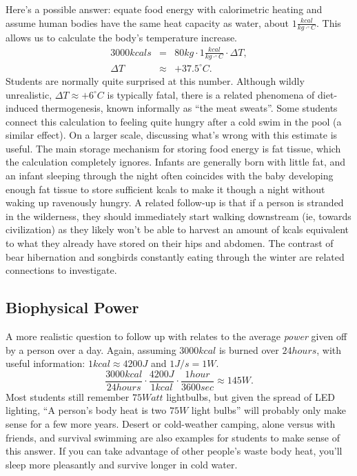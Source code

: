 \documentclass[prb,preprint]{revtex4-2}
\newcommand{\be}{\begin{equation}}
\newcommand{\ee}{\end{equation}}
\newcommand{\bea}{\begin{eqnarray}}
\newcommand{\eea}{\end{eqnarray}}
\newcommand{\degC}{^{\circ}C}
\begin{document}
Here's a possible answer:
equate food energy with calorimetric heating and assume human bodies have the same heat capacity as water, about $1\frac{kcal}{kg\cdot\degC}$. This allows us to calculate the body's temperature increase.
\bea
3000kcals &=& 80kg\cdot1 \frac{kcal}{kg\cdot \degC}\cdot\Delta T ,  \\
\Delta T &\approx& +37.5\degC . 
\eea
Students are normally quite surprised at this number.  Although wildly unrealistic, $\Delta T \approx +6\degC$ is typically fatal, there is a related phenomena of diet-induced thermogenesis,\cite{meat_sweats} known informally as ``the meat sweats''. Some students connect this calculation to feeling quite hungry after a cold swim in the pool (a similar effect).  On a larger scale, discussing what's wrong with this estimate is useful.  The main storage mechanism for storing food energy is fat tissue, which the calculation completely ignores.  Infants are generally born with little fat, and an infant sleeping through the night often coincides with the baby developing enough fat tissue to store sufficient kcals to make it though a night without waking up ravenously hungry.  A related follow-up is that if a person is stranded in the wilderness, they should immediately start walking downstream (ie, towards civilization) as they likely won't be able to harvest an amount of kcals equivalent to what they already have stored on their hips and abdomen.\cite{trout}  The contrast of bear hibernation\cite{fat_bear} and songbirds constantly eating through the winter are related connections to investigate.

\subsection{Biophysical Power}
A more realistic question to follow up with relates to the average \textit{power} given off by a person over a day.  
Again, assuming $3000kcal$ is burned over $24 hours$, with useful information: $1 kcal \approx 4200J$ and $1 J/s=1W$.
\be
\frac{3000kcal}{24hours}\cdot\frac{4200J}{1kcal}\cdot\frac{1hour}{3600sec}\approx145W .
\ee
Most students still remember $75Watt$ lightbulbs, but given the spread of LED lighting, ``A person's body heat is two $75W$ light bulbs'' will probably only make sense for a few more years.  Desert or cold-weather camping, alone versus with friends, and survival swimming are also examples for students to make sense of this answer.  If you can take advantage of other people's waste body heat, you'll sleep more pleasantly and survive longer in cold water.  
\end{document}
